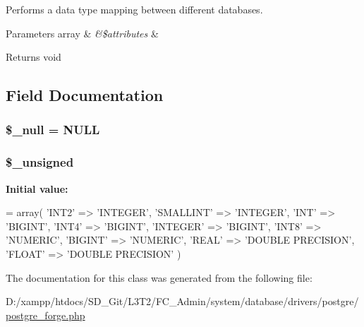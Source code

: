 Performs a data type mapping between different databases.


\begin{DoxyParams}[1]{Parameters}
array & {\em \&\$attributes} & \\
\hline
\end{DoxyParams}
\begin{DoxyReturn}{Returns}
void 
\end{DoxyReturn}


\subsection{Field Documentation}
\hypertarget{class_c_i___d_b__postgre__forge_ae58fe6a5104d4a069a49b27533ce808f}{}
\subsubsection[{\$\+\_\+null}]{\setlength{\rightskip}{0pt plus 5cm}\$\+\_\+null = \textquotesingle{}N\+U\+L\+L\textquotesingle{}\hspace{0.3cm}{\ttfamily [protected]}}\label{class_c_i___d_b__postgre__forge_ae58fe6a5104d4a069a49b27533ce808f}
\hypertarget{class_c_i___d_b__postgre__forge_aae977ae6d61fa183f0b25422b6ddc31c}{}
\subsubsection[{\$\+\_\+unsigned}]{\setlength{\rightskip}{0pt plus 5cm}\$\+\_\+unsigned\hspace{0.3cm}{\ttfamily [protected]}}\label{class_c_i___d_b__postgre__forge_aae977ae6d61fa183f0b25422b6ddc31c}
{\bfseries Initial value\+:}
\begin{DoxyCode}
= array(
        \textcolor{stringliteral}{'INT2'}      => \textcolor{stringliteral}{'INTEGER'},
        \textcolor{stringliteral}{'SMALLINT'}  => \textcolor{stringliteral}{'INTEGER'},
        \textcolor{stringliteral}{'INT'}       => \textcolor{stringliteral}{'BIGINT'},
        \textcolor{stringliteral}{'INT4'}      => \textcolor{stringliteral}{'BIGINT'},
        \textcolor{stringliteral}{'INTEGER'}   => \textcolor{stringliteral}{'BIGINT'},
        \textcolor{stringliteral}{'INT8'}      => \textcolor{stringliteral}{'NUMERIC'},
        \textcolor{stringliteral}{'BIGINT'}    => \textcolor{stringliteral}{'NUMERIC'},
        \textcolor{stringliteral}{'REAL'}      => \textcolor{stringliteral}{'DOUBLE PRECISION'},
        \textcolor{stringliteral}{'FLOAT'}     => \textcolor{stringliteral}{'DOUBLE PRECISION'}
    )
\end{DoxyCode}


The documentation for this class was generated from the following file\+:\begin{DoxyCompactItemize}
\item 
D\+:/xampp/htdocs/\+S\+D\+\_\+\+Git/\+L3\+T2/\+F\+C\+\_\+\+Admin/system/database/drivers/postgre/\hyperlink{postgre__forge_8php}{postgre\+\_\+forge.\+php}\end{DoxyCompactItemize}

